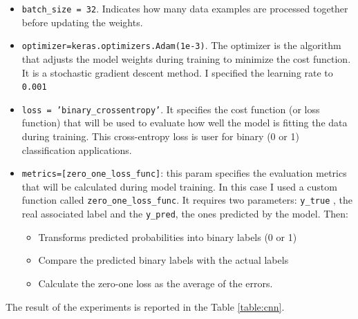 \begin{itemize}
\item \texttt{batch\_size =  32}. Indicates how many data examples are processed together before updating the weights.
\item \texttt{optimizer=keras.optimizers.Adam(1e-3)}. The optimizer is the algorithm that adjusts the model weights during training to minimize the cost function. It is a stochastic gradient descent method. I specified the learning rate to \texttt{0.001}
\item \texttt{loss = 'binary\_crossentropy'}. It specifies the cost function (or loss function) that will be used to evaluate how well the model is fitting the data during training. This cross-entropy loss is user for binary (0 or 1) classification applications.
\item \texttt{metrics=[zero\_one\_loss\_func]}: this param specifies the evaluation metrics that will be calculated during model training. In this case I used a custom function called \texttt{zero\_one\_loss\_func}. It requires two parameters: \texttt{y\_true} , the real associated label and the \texttt{y\_pred}, the ones predicted by the model. Then:
\begin{itemize}
\item Transforms predicted probabilities into binary labels (0 or 1)
\item Compare the predicted binary labels with the actual labels
\item Calculate the zero-one loss as the average of the errors.
\end{itemize}
\end{itemize}
The result of the experiments is reported in the Table \ref{table:cnn}.
